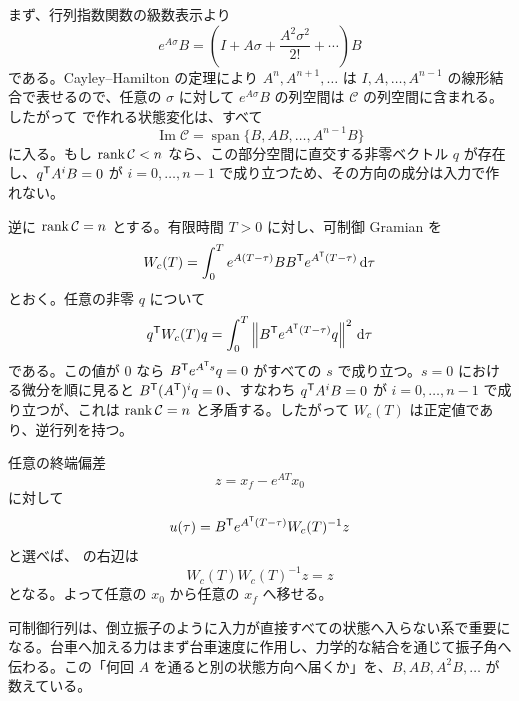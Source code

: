 \begin{derivation}
まず、行列指数関数の級数表示より
\begin{equation}
  e^{A\sigma}B
  =\left(I+A\sigma+\frac{A^2\sigma^2}{2!}+\cdots\right)B
\end{equation}
である。Cayley--Hamilton の定理により $A^n,A^{n+1},\ldots$ は $I,A,\ldots,A^{n-1}$ の線形結合で表せるので、任意の $\sigma$ に対して $e^{A\sigma}B$ の列空間は $\mathcal{C}$ の列空間に含まれる。したがって  で作れる状態変化は、すべて
\begin{equation}
  \operatorname{Im}\mathcal{C}
  =\operatorname{span}\{B,AB,\ldots,A^{n-1}B\}
\end{equation}
に入る。もし $\operatorname{rank}\mathcal{C}<n$ なら、この部分空間に直交する非零ベクトル $q$ が存在し、$q^{\mathsf{T}} A^iB=0$ が $i=0,\ldots,n-1$ で成り立つため、その方向の成分は入力で作れない。

逆に $\operatorname{rank}\mathcal{C}=n$ とする。有限時間 $T>0$ に対し、可制御 Gramian を
\begin{equation}
  W_c(T)=\int_0^T e^{A(T-\tau)}BB^{\mathsf{T}} e^{A^{\mathsf{T}}(T-\tau)}\,\mathrm{d}\tau
\end{equation}
とおく。任意の非零 $q$ について
\begin{equation}
  q^{\mathsf{T}} W_c(T)q
  =\int_0^T \left\|B^{\mathsf{T}} e^{A^{\mathsf{T}}(T-\tau)}q\right\|^2\,\mathrm{d}\tau
\end{equation}
である。この値が 0 なら $B^{\mathsf{T}} e^{A^{\mathsf{T}} s}q=0$ がすべての $s$ で成り立つ。$s=0$ における微分を順に見ると $B^{\mathsf{T}}(A^{\mathsf{T}})^iq=0$、すなわち $q^{\mathsf{T}} A^iB=0$ が $i=0,\ldots,n-1$ で成り立つが、これは $\operatorname{rank}\mathcal{C}=n$ と矛盾する。したがって $W_c(T)$ は正定値であり、逆行列を持つ。

任意の終端偏差
\begin{equation}
  z=x_f-e^{AT}x_0
\end{equation}
に対して
\begin{equation}
  u(\tau)=B^{\mathsf{T}} e^{A^{\mathsf{T}}(T-\tau)}W_c(T)^{-1}z
\end{equation}
と選べば、 の右辺は
\begin{equation}
  W_c(T)W_c(T)^{-1}z=z
\end{equation}
となる。よって任意の $x_0$ から任意の $x_f$ へ移せる。
\end{derivation}

可制御行列は、倒立振子のように入力が直接すべての状態へ入らない系で重要になる。台車へ加える力はまず台車速度に作用し、力学的な結合を通じて振子角へ伝わる。この「何回 $A$ を通ると別の状態方向へ届くか」を、$B,AB,A^2B,\ldots$ が数えている。

